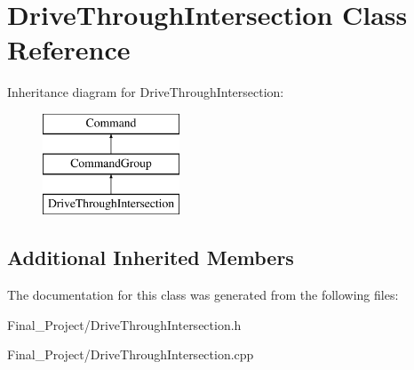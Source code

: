 \hypertarget{classDriveThroughIntersection}{\section{Drive\-Through\-Intersection Class Reference}
\label{classDriveThroughIntersection}
}
Inheritance diagram for Drive\-Through\-Intersection\-:\begin{figure}[H]
\begin{center}
\leavevmode
\includegraphics[height=3.000000cm]{classDriveThroughIntersection}
\end{center}
\end{figure}
\subsection*{Additional Inherited Members}


The documentation for this class was generated from the following files\-:\begin{DoxyCompactItemize}
\item 
Final\-\_\-\-Project/Drive\-Through\-Intersection.\-h\item 
Final\-\_\-\-Project/Drive\-Through\-Intersection.\-cpp\end{DoxyCompactItemize}
